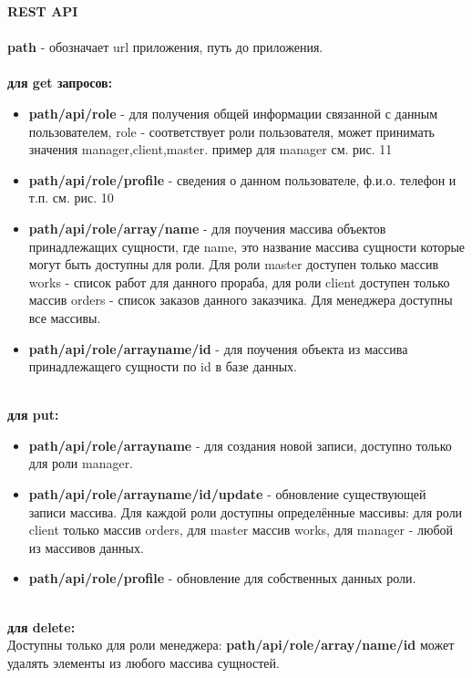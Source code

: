 \textbf{REST API}\\\\
\textbf{\textbraceleft path\textbraceright} - обозначает url приложения, путь до приложения.\\\\
\textbf{для get запросов:}\\
\begin{itemize}
\item \textbf{\textbraceleft path\textbraceright /api/\textbraceleft role\textbraceright} - для получения общей информации связанной с данным пользователем, role - соответствует роли пользователя, может принимать значения manager,client,master. пример для manager см. рис. 11
\item \textbf{\textbraceleft path\textbraceright /api/\textbraceleft role\textbraceright /profile} - сведения о данном пользователе, ф.и.о. телефон и т.п. см. рис. 10
\item \textbf{\textbraceleft path\textbraceright /api/\textbraceleft role\textbraceright /array/\textbraceleft name\textbraceright} - для поучения массива объектов принадлежащих сущности, где name, это название массива сущности которые могут быть доступны для роли.
Для роли master доступен только массив works - список работ для данного прораба, для роли client доступен только массив orders - список заказов данного заказчика. Для менеджера доступны все массивы.
\item \textbf{\textbraceleft path\textbraceright /api/\textbraceleft role\textbraceright /array\textbraceleft name\textbraceright /\textbraceleft id\textbraceright} - для поучения объекта из массива принадлежащего сущности по id в базе данных.
\end{itemize}
\textbf{\\для put:}\\
\begin{itemize}
\item \textbf{\textbraceleft path\textbraceright /api/\textbraceleft role\textbraceright /array\textbraceleft name\textbraceright} - для создания новой записи, доступно только для роли manager.
\item \textbf{\textbraceleft path\textbraceright /api/\textbraceleft role\textbraceright /array\textbraceleft name\textbraceright /\textbraceleft id\textbraceright /update} - обновление существующей записи массива. Для каждой роли доступны определённые массивы: для роли client только массив orders, для master массив works, для manager - любой из массивов данных.
\item \textbf{\textbraceleft path\textbraceright /api/\textbraceleft role\textbraceright /profile} - обновление для собственных данных роли.
\end{itemize}
\textbf{\\для delete:}\\
Доступны только для роли менеджера:
\textbf{\textbraceleft path\textbraceright /api/\textbraceleft role\textbraceright /array/\textbraceleft name\textbraceright /\textbraceleft id\textbraceright}
может удалять элементы из любого массива сущностей.\\\\


